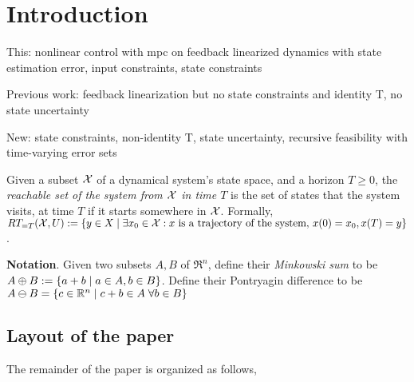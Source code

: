 \section{Introduction}
\label{sec:intro}



This:
nonlinear control with mpc on feedback linearized dynamics with state estimation error, input constraints, state constraints

Previous work: feedback linearization but no state constraints and identity T, no state uncertainty

New:	
state constraints, 
non-identity T,
state uncertainty,
recursive feasibility with time-varying error sets

Given a subset $\mathcal{X}$ of a dynamical system's state space, and a horizon $T \geq 0$, the \emph{reachable set of the system from $\mathcal{X}$ in time $T$} is the set of states that the system visits, at time $T$ if it starts somewhere in $\mathcal{X}$.
Formally, $RT_{=T}(\mathcal{X},U) := \{y \in X \;|\; \exists x_0 \in \mathcal{X}: x \text{ is a trajectory of the system, }x(0)=x_0, x(T)=y\}$.

\textbf{Notation}.
Given two subsets $A,B$ of $\Re^n$, define their \textit{Minkowski sum} to be $A\oplus B := \{a+b \;|\; a\in A, b\in B\}$.
Define their Pontryagin difference to be $A\ominus B = \{c \in \mathbb{R}^n \;|\; c+b \in A\; \forall b \in B\}$

\subsection{Layout of the paper}

The remainder of the paper is organized as follows,